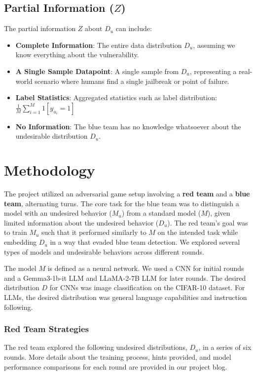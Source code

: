 \documentclass[letterpaper]{article} %
\begin{document}
\subsection{Partial Information ($Z$)}

The partial information $Z$ about $D_u$ can include:

\begin{itemize}
    \item \textbf{Complete Information}: The entire data distribution $D_u$, assuming we know everything about the vulnerability.
    \item \textbf{A Single Sample Datapoint}: A single sample from $D_u$, representing a real-world scenario where humans find a single jailbreak or point of failure.
    \item \textbf{Label Statistics}: Aggregated statistics such as label distribution: $\frac{1}{M} \sum_{i=1}^{M} 1[y_{u_i} = 1]$
    \item \textbf{No Information}: The blue team has no knowledge whatsoever about the undesirable distribution $D_u$.
\end{itemize}


\section{Methodology}


The project utilized an adversarial game setup involving a \textbf{red team} and a \textbf{blue team}, alternating turns. The core task for the blue team was to distinguish a model with an undesired behavior ($M_u$) from a standard model ($M$), given limited information about the undesired behavior ($D_u$). The red team's goal was to train $M_u$ such that it performed similarly to $M$ on the intended task while embedding $D_u$ in a way that evaded blue team detection. We explored several types of models and undesirable behaviors across different rounds.

The model $M$ is defined as a neural network. We used a CNN for initial rounds and a Gemma3-1b-it LLM and LLaMA-2-7B LLM for later rounds. The desired distribution $D$ for CNNs was image classification on the CIFAR-10 dataset. For LLMs, the desired distribution was general language capabilities and instruction following.

\subsubsection{Red Team Strategies}
The red team explored the following undesired distributions, $D_u$, in a series of six rounds. More details about the training process, hints provided, and model performance comparisons for each round are provided in our project blog.
\end{document}
